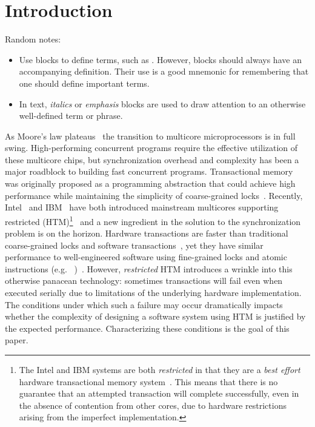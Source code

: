\section{Introduction}
Random notes:
\begin{itemize}
\item Use  blocks to define terms, such as 
.  However,  
blocks should always have an accompanying definition.  Their
use is a good mnemonic for remembering that one should define
important terms.
\item In text, \textit{italics} or \emph{emphasis} blocks
are used to draw attention to an otherwise well-defined term
or phrase.  
\end{itemize}


As Moore's law plateaus~\cite{???} the transition
to multicore microprocessors is in full swing. High-performing concurrent
programs require the effective utilization of these multicore chips, but 
synchronization overhead and complexity has been a
major roadblock to building fast concurrent programs.
Transactional memory~\cite{HerlihyMo93} was originally
proposed as a programming abstraction that could achieve
high performance while maintaining the simplicity of 
coarse-grained locks~\cite{???}.
Recently, Intel~\cite{???} and IBM~\cite{???} 
have both introduced mainstream 
multicores supporting restricted  (HTM)\footnote{The Intel and IBM
systems are both \emph{restricted} in that they are 
a \emph{best effort} hardware transactional
memory system~\cite{???}.  This means that there is no 
guarantee that an attempted
transaction will complete successfully, even in the absence 
of contention from other cores, due to hardware restrictions
arising from the imperfect implementation.}~\cite{???}
and a new ingredient in the solution 
to the synchronization problem is
on the horizon. Hardware transactions are faster than traditional
coarse-grained locks and software transactions~\cite{???}, 
yet they have similar performance to well-engineered software
using fine-grained locks and atomic instructions (e.g.
~\cite{???})~\cite{???}. 
However, \emph{restricted} HTM introduces a wrinkle into 
this otherwise panacean technology: sometimes transactions
will fail even when executed serially due to limitations
of the underlying hardware implementation.  The conditions
under which such a failure may occur dramatically impacts
whether the complexity of designing a software system using HTM
is justified by the expected performance.  Characterizing
these conditions is the goal of this paper. 

